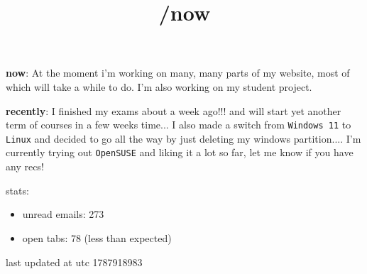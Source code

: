\documentclass{article}
\title{/now}
\author{}
\date{}
\begin{document}

\maketitle
\textbf{now}: At the moment i'm working on many, many parts of my website, most of which will take a while to do. 
I'm also working on my student project. 

\textbf{recently}: I finished my exams about a week ago!!! and will start yet another term of courses in a few weeks time... 
I also made a switch from \texttt{Windows 11} to \texttt{Linux} and decided to go all the way by just deleting my windows partition....
I'm currently trying out  \texttt{OpenSUSE} and liking it a lot so far, let me know if you have any recs!


stats:
\begin{itemize}
\item unread emails: 273 \
\item open tabs: 78 (less than expected)
\end{itemize}

last updated at utc 1787918983

\end{document}
